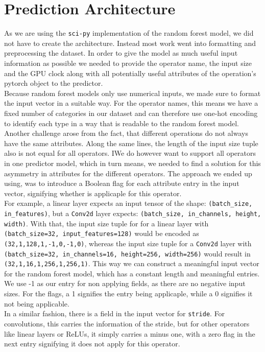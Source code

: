 \section{Prediction Architecture}
As we are using the \texttt{sci-py} implementation of the random forest model, we did not have to create the architecture. Instead most work went into formatting and preprocessing the dataset. In order to give the model as much useful input information as possible we needed to provide the operator name, the input size and the GPU clock along with all potentially useful attributes of the operation's pytorch object to the predictor. \\
Because random forest models only use numerical inputs, we made sure to format the input vector in a suitable way. For the operator names, this means we have a fixed number of categories in our dataset and can therefore use one-hot encoding to identify each type in a way that is readable to the random forest model. Another challenge arose from the fact, that different operations do not always have the same attributes. Along the same lines, the length of the input size tuple also is not equal for all operators. IWe do however want to support all operators in one predictor model, which in turn means, we needed to find a solution for this asymmetry in attributes for the different operators. The approach we ended up using, was to introduce a Boolean flag for each attribute entry in the input vector, signifying whether is applicaple for this operator.\\
For example, a linear layer expects an input tensor of the shape: \texttt{(batch\_size, in\_features)}, but a \texttt{Conv2d} layer expects: \texttt{(batch\_size, in\_channels, height, width)}. With that, the input size tuple for for a linear layer with \texttt{(batch\_size=32, input\_features=128)} would be encoded as \texttt{(32,1,128,1,-1,0,-1,0)}, whereas the input size tuple for a \texttt{Conv2d} layer with \texttt{(batch\_size=32, in\_channels=16, height=256, width=256)} would result in \texttt{(32,1,16,1,256,1,256,1)}. This way we can construct a meaningful input vector for the random forest model, which has a constant length and meaningful entries. We use -1 as our entry for non applying fields, as there are no negative input sizes. For the flags, a 1 signifies the entry being applicaple, while a 0 signifies it not being applicable.\\
In a similar fashion, there is a field in the input vector for \texttt{stride}. For convolutions, this carries the information of the stride, but for other operators like  linear layers or ReLUs, it simply carries a minus one, with a zero flag in the next entry signifying it does not apply for this operator. \\
